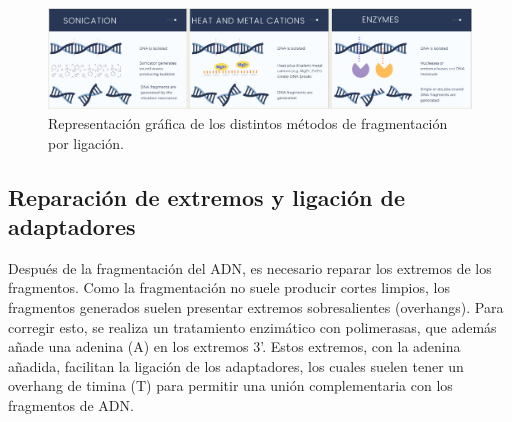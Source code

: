 \begin{itemize}
\begin{figure}[htbp]
\centering
\includegraphics[width = \textwidth]{figs/ligation-methods.png}
\caption{Representación gráfica de los distintos métodos de fragmentación por ligación.}
\end{figure}

\begin{table}[htbp]
\centering
{}
\caption{Pros y contras de cada método de fragmentación por ligación}
\end{table}

\subsection{Reparación de extremos y ligación de adaptadores}
Después de la fragmentación del ADN, es necesario reparar los extremos de los fragmentos. Como la fragmentación no suele producir cortes limpios, los fragmentos generados suelen presentar extremos sobresalientes (overhangs). Para corregir esto, se realiza un tratamiento enzimático con polimerasas, que además añade una adenina (A) en los extremos 3’. Estos extremos, con la adenina añadida, facilitan la ligación de los adaptadores, los cuales suelen tener un overhang de timina (T) para permitir una unión complementaria con los fragmentos de ADN.


\end{itemize}
